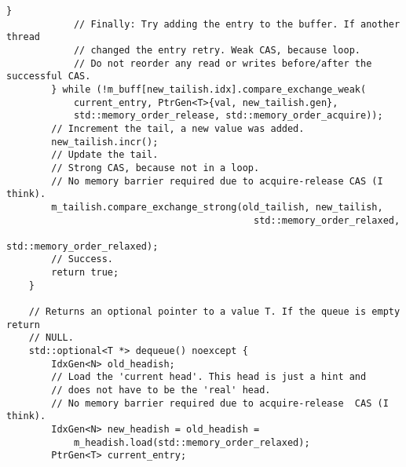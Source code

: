 \begin{lstlisting}[caption={Van Eerd's "An Interesting Lock-free Queue"},label=append_mpmc]
            }
            // Finally: Try adding the entry to the buffer. If another thread
            // changed the entry retry. Weak CAS, because loop.
            // Do not reorder any read or writes before/after the successful CAS.
        } while (!m_buff[new_tailish.idx].compare_exchange_weak(
            current_entry, PtrGen<T>{val, new_tailish.gen},
            std::memory_order_release, std::memory_order_acquire));
        // Increment the tail, a new value was added.
        new_tailish.incr();
        // Update the tail.
        // Strong CAS, because not in a loop.
        // No memory barrier required due to acquire-release CAS (I think).
        m_tailish.compare_exchange_strong(old_tailish, new_tailish,
                                            std::memory_order_relaxed,
                                            std::memory_order_relaxed);
        // Success.
        return true;
    }

    // Returns an optional pointer to a value T. If the queue is empty return
    // NULL.
    std::optional<T *> dequeue() noexcept {
        IdxGen<N> old_headish;
        // Load the 'current head'. This head is just a hint and
        // does not have to be the 'real' head.
        // No memory barrier required due to acquire-release  CAS (I think).
        IdxGen<N> new_headish = old_headish =
            m_headish.load(std::memory_order_relaxed);
        PtrGen<T> current_entry;


\end{lstlisting}

